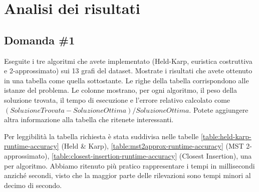 \section{Analisi dei risultati}
\label{cap:performance-analysis}

\subsection{Domanda \#1}
\label{sec:question-1}

\begin{displayquote}
Eseguite i tre algoritmi che avete implementato (Held-Karp,
euristica costruttiva e 2-approssimato) sui 13 grafi del dataset.
Mostrate i risultati che avete ottenuto in una tabella come quella
sottostante. Le righe della tabella corrispondono alle istanze del
problema. Le colonne mostrano, per ogni algoritmo, il peso della
soluzione trovata, il tempo di esecuzione e l'errore relativo
calcolato come $(SoluzioneTrovata-SoluzioneOttima)/SoluzioneOttima$.
Potete aggiungere altra informazione alla tabella che ritenete
interessanti.
\end{displayquote}

\noindent Per leggibilità la tabella richiesta è stata suddivisa nelle
tabelle
\ref{table:held-karp-runtime-accuracy} (Held \& Karp),
\ref{table:mst2approx-runtime-accuracy} (MST 2-approssimato),
\ref{table:closest-insertion-runtime-accuracy} (Closest Insertion),
una per algoritmo. Abbiamo ritenuto più pratico rappresentare i tempi in millisecondi anziché secondi, visto che la maggior parte delle rilevazioni sono tempi minori al decimo di secondo.

